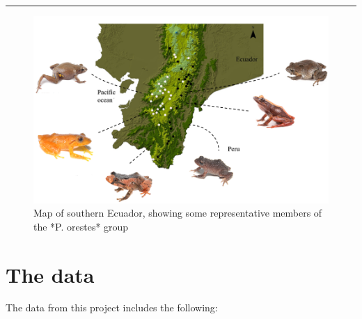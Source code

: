 \documentclass[
]{book}
\begin{document}
\begin{center}\rule{0.5\linewidth}{0.5pt}\end{center}

\begin{figure}

{\centering \includegraphics[width=13.71in]{figure1} 

}

\caption{Map of southern Ecuador, showing some representative members of the *P. orestes* group}\label{fig:plot1}
\end{figure}

\hypertarget{the-data}{%
\section{The data}\label{the-data}}

The data from this project includes the following:
\end{document}
